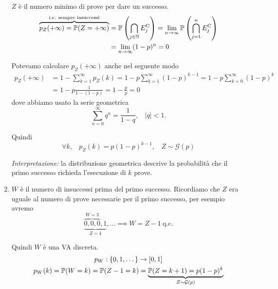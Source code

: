 \begin{enumerate}
$Z$ è il numero minimo di prove per dare un successo.\begin{equation*}
\begin{aligned}
\overbrace{p_{Z}( +\infty ) =\mathbb{P}( Z=+\infty )}^{\text{i.e. sempre insuccessi}} & =\mathbb{P}\left(\bigcap _{j\in \mathbb{N}} E_{j}^{\mathrm{C}}\right) =\lim _{n\rightarrow \infty }\mathbb{P}\left(\bigcap _{j=1}^{n} E_{j}^{\mathrm{C}}\right)\\
 & =\lim _{n\rightarrow \infty }( 1-p)^{n} =0
\end{aligned}
\end{equation*}

\begin{oss}
Potevamo calcolare $p_{Z}( +\infty )$ anche nel seguente modo
\begin{equation*}
\begin{aligned}
p_{Z}( +\infty ) & =1-\sum\limits _{k=1}^{\infty } p_{Z}( k) =1-p\sum\limits _{k=1}^{\infty }( 1-p)^{k-1} =1-p\sum\limits _{k=0}^{\infty }( 1-p)^{k}\\
 & =1-p\frac{1}{1-( 1-p)} =1-\frac{p}{p} =0
\end{aligned}
\end{equation*}
dove abbiamo usato la serie geometrica
\begin{equation*}
\sum\limits _{n=0}^{\infty } q^{n} =\frac{1}{1-q} ,\ \ \ \ | q| < 1.
\end{equation*}
\end{oss}

Quindi\begin{equation*}
\forall k,\ \ \ \ p_{Z}( k) =p( 1-p)^{k-1} ,\ \ \ \ \boxed{Z\sim \mathcal{G}( p)}
\end{equation*}

\textit{Interpretazione:} la distribuzione geometrica descrive la probabilità che il primo successo richieda l'esecuzione di $k$ prove.
\item $W$ è il numero di insuccessi prima del primo successo. Ricordiamo che $Z$ era uguale al numero di prove necessarie per il primo successo, per esempio avremo\begin{equation*}
\underbrace{\overbrace{0,0,0}^{W=3} ,1}_{Z=4} ,\dots \implies W=Z-1\ \text{q.c.}
\end{equation*}

Quindi $W$ è una VA discreta.\begin{gather*}
p_{W} :\{0,1,\dots \}\rightarrow [ 0,1]\\
p_{W}( k) =\mathbb{P}( W=k) =\mathbb{P}( Z-1=k) =\underbrace{\mathbb{P}( Z=k+1) =p( 1-p)^{k}}_{Z\sim \mathcal{G}( p)}
\end{gather*}


\end{enumerate}
